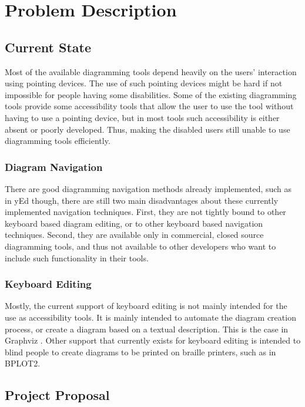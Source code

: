 \chapter{Problem Description}
\beginchapter

\section{Current State}
Most of the available diagramming tools depend heavily on the users' interaction using pointing devices. The use of such pointing devices might be hard if not impossible for people having some disabilities. Some of the existing diagramming tools provide some accessibility tools that allow the user to use the tool without having to use a pointing device, but in most tools such accessibility is either absent or poorly developed. Thus, making the disabled users still unable to use diagramming tools efficiently.

\subsection{Diagram Navigation}
There are good diagramming navigation methods already implemented, such as in yEd \cite{yed} though, there are still two main disadvantages about these currently implemented navigation techniques. First, they are not tightly bound to other keyboard based diagram editing, or to other keyboard based navigation techniques. Second, they are available only in commercial, closed source diagramming tools, and thus not available to other developers who want to include such functionality in their tools.

\subsection{Keyboard Editing}
Mostly, the current support of keyboard editing is not mainly intended for the use as accessibility tools. It is mainly intended to automate the diagram creation process, or create a diagram based on a textual description. This is the case in Graphviz \cite{graphviz}. Other support that currently exists for keyboard editing is intended to blind people to create diagrams to be printed on braille printers, such as in BPLOT2. \cite{bplot2}

\section{Project Proposal}
